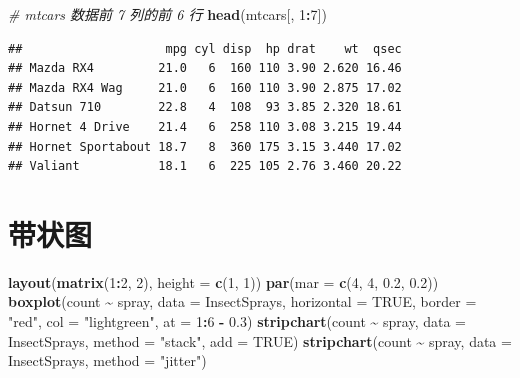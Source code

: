 \documentclass[
  b5paper,
  UTF8,twoside]{book}
\newenvironment{Shaded}{\begin{snugshade}}{\end{snugshade}}
\newcommand{\AttributeTok}[1]{\textcolor[rgb]{0.13,0.29,0.53}{#1}}
\newcommand{\CommentTok}[1]{\textcolor[rgb]{0.56,0.35,0.01}{\textit{#1}}}
\newcommand{\ConstantTok}[1]{\textcolor[rgb]{0.56,0.35,0.01}{#1}}
\newcommand{\DecValTok}[1]{\textcolor[rgb]{0.00,0.00,0.81}{#1}}
\newcommand{\FloatTok}[1]{\textcolor[rgb]{0.00,0.00,0.81}{#1}}
\newcommand{\FunctionTok}[1]{\textcolor[rgb]{0.13,0.29,0.53}{\textbf{#1}}}
\newcommand{\NormalTok}[1]{#1}
\newcommand{\SpecialCharTok}[1]{\textcolor[rgb]{0.81,0.36,0.00}{\textbf{#1}}}
\newcommand{\StringTok}[1]{\textcolor[rgb]{0.31,0.60,0.02}{#1}}
\begin{document}
\begin{Shaded}
\begin{Highlighting}[]
\CommentTok{\# mtcars 数据前 7 列的前 6 行}
\FunctionTok{head}\NormalTok{(mtcars[, }\DecValTok{1}\SpecialCharTok{:}\DecValTok{7}\NormalTok{])}
\end{Highlighting}
\end{Shaded}

\begin{verbatim}
##                    mpg cyl disp  hp drat    wt  qsec
## Mazda RX4         21.0   6  160 110 3.90 2.620 16.46
## Mazda RX4 Wag     21.0   6  160 110 3.90 2.875 17.02
## Datsun 710        22.8   4  108  93 3.85 2.320 18.61
## Hornet 4 Drive    21.4   6  258 110 3.08 3.215 19.44
## Hornet Sportabout 18.7   8  360 175 3.15 3.440 17.02
## Valiant           18.1   6  225 105 2.76 3.460 20.22
\end{verbatim}

\section{带状图}\label{sec:stripchart}





\begin{Shaded}
\begin{Highlighting}[]
\FunctionTok{layout}\NormalTok{(}\FunctionTok{matrix}\NormalTok{(}\DecValTok{1}\SpecialCharTok{:}\DecValTok{2}\NormalTok{, }\DecValTok{2}\NormalTok{), }\AttributeTok{height =} \FunctionTok{c}\NormalTok{(}\DecValTok{1}\NormalTok{, }\DecValTok{1}\NormalTok{))}
\FunctionTok{par}\NormalTok{(}\AttributeTok{mar =} \FunctionTok{c}\NormalTok{(}\DecValTok{4}\NormalTok{, }\DecValTok{4}\NormalTok{, }\FloatTok{0.2}\NormalTok{, }\FloatTok{0.2}\NormalTok{))}
\FunctionTok{boxplot}\NormalTok{(count }\SpecialCharTok{\textasciitilde{}}\NormalTok{ spray, }\AttributeTok{data =}\NormalTok{ InsectSprays, }\AttributeTok{horizontal =} \ConstantTok{TRUE}\NormalTok{, }
        \AttributeTok{border =} \StringTok{"red"}\NormalTok{, }\AttributeTok{col =} \StringTok{"lightgreen"}\NormalTok{, }\AttributeTok{at =} \DecValTok{1}\SpecialCharTok{:}\DecValTok{6} \SpecialCharTok{{-}} \FloatTok{0.3}\NormalTok{)}
\FunctionTok{stripchart}\NormalTok{(count }\SpecialCharTok{\textasciitilde{}}\NormalTok{ spray, }\AttributeTok{data =}\NormalTok{ InsectSprays, }\AttributeTok{method =} \StringTok{"stack"}\NormalTok{, }\AttributeTok{add =} \ConstantTok{TRUE}\NormalTok{)}
\FunctionTok{stripchart}\NormalTok{(count }\SpecialCharTok{\textasciitilde{}}\NormalTok{ spray, }\AttributeTok{data =}\NormalTok{ InsectSprays, }\AttributeTok{method =} \StringTok{"jitter"}\NormalTok{)}
\end{Highlighting}
\end{Shaded}
\end{document}
